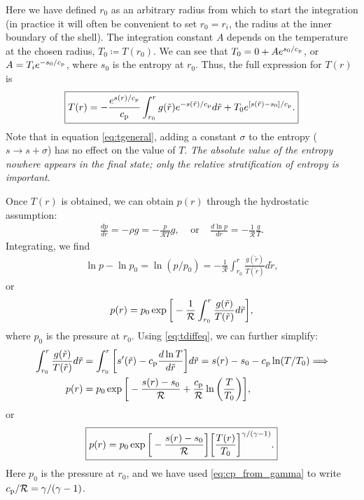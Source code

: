 \documentclass[12pt]{article} %
\newcommand{\cp}{c_{\rm{p}}}
\newcommand{\orr}{\text{or}\ \ \ \ \ }
\newcommand{\tr}{\tilde{r}}
\begin{document}
	Here we have defined $r_0$ as an arbitrary radius from which to start the integration (in practice it will often be convenient to set $r_0=r_i$, the radius at the inner boundary of the shell). The integration constant $A$ depends on the temperature at the chosen radius, $T_0\coloneqq T(r_0)$. We can see that $T_0 = 0 + Ae^{s_0/\cp}$, or $A=T_ie^{-s_0/\cp}$, where $s_0$ is the entropy at $r_0$. Thus, the full expression for $T(r)$ is
	\begin{align}
	\boxed{
	T(r) = -\frac{e^{s(r)/\cp}}{\cp}\int_{r_0}^r g(\tilde{r})e^{-s(\tilde{r})/\cp}d\tilde{r} + T_0e^{[s(\tilde{r})-s_0]/\cp}.
	\label{eq:tgeneral}}
	\end{align}
	Note that in equation \eqref{eq:tgeneral}, adding a constant $\sigma$ to the entropy ($s\longrightarrow s+\sigma$) has no effect on the value of $T$. \textit{The absolute value of the entropy nowhere appears in the final state; only the relative stratification of entropy is important}. 
	
	Once $T(r)$ is obtained, we can obtain $p(r)$ through the hydrostatic assumption:
	\begin{align*}
	\frac{dp}{dr}=-\rho g = -\frac{p}{\mathcal{R}T}g, \ \ \ \ \ \orr \frac{d\ln{p}}{dr} = -\frac{1}{\mathcal{R}}\frac{g}{T}.
	\end{align*}
	Integrating, we find
	\begin{align*}
	\ln{p} - \ln{p_0} = \ln{(p/p_0)} = -\frac{1}{\mathcal{R}}\int_{r_0}^r\frac{g(\tilde{r})}{T(\tilde{r})}d\tilde{r},
	\end{align*}
	or
	\begin{align*}
	p(r) = p_0\exp{\bigg{[}-\frac{1}{\mathcal{R}}\int_{r_0}^r\frac{g(\tilde{r})}{T(\tilde{r})}d\tilde{r}\bigg{]}},
	\end{align*}
	where $p_0$ is the pressure at $r_0$. Using \eqref{eq:tdiffeq}, we can further simplify:
	\begin{align*}
	\int_{r_0}^r \frac{g(\tr)}{T(\tr)}d\tr &= \int_{r_0}^r\bigg{[}s^\prime(\tr) - \cp \frac{d\ln T}{d\tr}\bigg{]}d\tr = s(r) - s_0 - \cp \ln(T/T_0)\Longrightarrow \\
	p(r) &= p_0\exp\bigg{[}-\frac{s(r) - s_0}{\mathcal{R}} + \frac{\cp}{\mathcal{R}}\ln\bigg{(}\frac{T}{T_0}\bigg{)}\bigg{]},
	\end{align*}
	or
	\begin{align}
	\boxed{
	p(r)=p_0\exp\bigg{[}-\frac{s(r) - s_0}{\mathcal{R}}\bigg{]}\bigg{[}\frac{T(r)}{T_0}\bigg{]}^{\gamma/(\gamma - 1)}.
}
\label{eq:pgeneral}
	\end{align}
	Here $p_0$ is the pressure at $r_0$, and we have used \eqref{eq:cp_from_gamma} to write $\cp/\mathcal{R} = \gamma/(\gamma-1)$.
	
\end{document}
